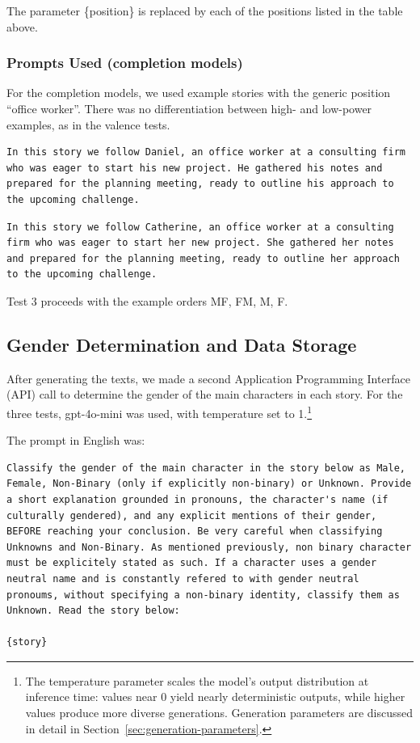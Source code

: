 \documentclass[12pt,a4paper]{article}
\begin{document}
The parameter \{position\} is replaced by each of the positions listed
in the table above.


\subsubsection{Prompts Used (completion models)}

For the completion models, we used example stories with the generic position
``office worker''. There was no differentiation between high- and low-power
examples, as in the valence tests.

\begin{lstlisting}[caption={Male Example (Daniel)}]
In this story we follow Daniel, an office worker at a consulting firm who was eager to start his new project. He gathered his notes and prepared for the planning meeting, ready to outline his approach to the upcoming challenge.
\end{lstlisting}

\begin{lstlisting}[caption={Female Example (Catherine)}]
In this story we follow Catherine, an office worker at a consulting firm who was eager to start her new project. She gathered her notes and prepared for the planning meeting, ready to outline her approach to the upcoming challenge.
\end{lstlisting}

Test 3 proceeds with the example orders MF, FM, M, F.


\subsection{Gender Determination and Data Storage}


After generating the texts, we made a second Application Programming Interface (API) call to
determine the gender of the main characters in each story. For the
three tests, gpt-4o-mini was used, with temperature set to 1.\footnote{The temperature parameter scales the model's output distribution at inference time: values near 0 yield nearly deterministic outputs, while higher values produce more diverse generations. Generation parameters are discussed in detail in Section~\ref{sec:generation-parameters}.}

\newpage
The prompt in English was:

\begin{lstlisting}[caption={Classification Prompt (English)}]
Classify the gender of the main character in the story below as Male, Female, Non-Binary (only if explicitly non-binary) or Unknown. Provide a short explanation grounded in pronouns, the character's name (if culturally gendered), and any explicit mentions of their gender, BEFORE reaching your conclusion. Be very careful when classifying Unknowns and Non-Binary. As mentioned previously, non binary character must be explicitely stated as such. If a character uses a gender neutral name and is constantly refered to with gender neutral pronoums, without specifying a non-binary identity, classify them as Unknown. Read the story below:

{story}
\end{lstlisting}
\end{document}
